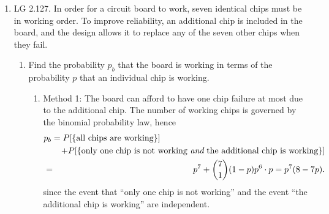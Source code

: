 


%

\usepackage{fullpage}
\usepackage{fancyhdr}

\usepackage{graphicx}

\pagestyle{fancy}

\addtolength{\headsep}{.5cm}




\renewcommand{\emph}[1]{{\it #1}}


\setlength{\headheight}{15pt}
\maketitle

\begin{enumerate}
	\item LG 2.127. In order for a circuit board to work,
	seven identical chips must be in working order.
	To improve reliability, an additional chip is included in the board,
	and the design allows it to replace any of the seven other chips
	when they fail.
	\begin{enumerate}
		\item Find the probability $p_b$ that the board is working
		in terms of the probability $p$ that an individual chip is working.
		\ifdefined\sol
		\begin{solution}
			\begin{enumerate}
				\item Method 1:
				The board can afford to have one chip failure at most
				due to the additional chip.
				The number of working chips is governed
				by the binomial probability law,
				hence
				\begin{eqnarray*}
					\lefteqn{
					p_b =
					\pr{\{\mbox{all chips are working}\}}
					}
					\\&&
					+ \pr{\{\mbox{only one chip is not working \emph{and} the additional chip is working}\}}
					\\&=& p^7 + {7 \choose 1} (1-p) p^6 \cdot p
					= p^7 ( 8 - 7p).
				\end{eqnarray*}
				since the event that ``only one chip is not working''
				and the event ``the additional chip is working''
				are independent.


\end{enumerate}
\end{solution}
\end{enumerate}
\end{enumerate}
